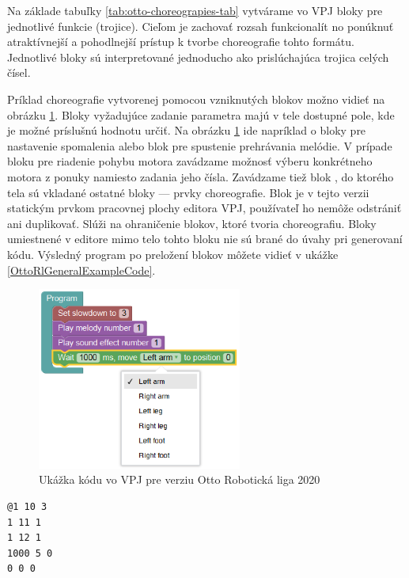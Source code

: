 Na základe tabuľky \ref{tab:otto-choreograpies-tab} vytvárame vo VPJ bloky pre jednotlivé funkcie (trojice). Cieľom je zachovať rozsah funkcionalít no ponúknuť atraktívnejší a pohodlnejší prístup k tvorbe choreografie tohto formátu. Jednotlivé bloky sú interpretované jednoducho ako prislúchajúca trojica celých čísel.

Príklad choreografie vytvorenej pomocou vzniknutých blokov možno vidieť na obrázku \ref{obr:otto-rl-blockly-general-example}. Bloky vyžadujúce zadanie parametra majú v tele dostupné pole, kde je možné príslušnú hodnotu určiť. Na obrázku \ref{obr:otto-rl-blockly-general-example} ide napríklad o bloky pre nastavenie spomalenia alebo blok pre spustenie prehrávania melódie. V prípade bloku pre riadenie pohybu motora zavádzame možnosť výberu konkrétneho motora z ponuky namiesto zadania jeho čísla. Zavádzame tiež blok , do ktorého tela sú vkladané ostatné bloky --- prvky choreografie. Blok  je v tejto verzii statickým prvkom pracovnej plochy editora VPJ, používateľ ho nemôže odstrániť ani duplikovať. Slúži na ohraničenie blokov, ktoré tvoria choreografiu. Bloky umiestnené v editore mimo telo tohto bloku nie sú brané do úvahy pri generovaní kódu. Výsledný program po preložení blokov môžete vidieť v ukážke \ref{OttoRlGeneralExampleCode}.


\begin{figure}
\centerline{\includegraphics[width=0.6\textwidth]{images/otto-rl-blockly-general}}
\caption[Ukážka kódu vo VPJ pre verziu Otto Robotická liga 2020]{Ukážka kódu vo VPJ pre verziu Otto Robotická liga 2020}
\label{obr:otto-rl-blockly-general-example}
\end{figure}

\begin{lstlisting}[frame=single]
@1 10 3
1 11 1
1 12 1
1000 5 0
0 0 0
\end{lstlisting}



